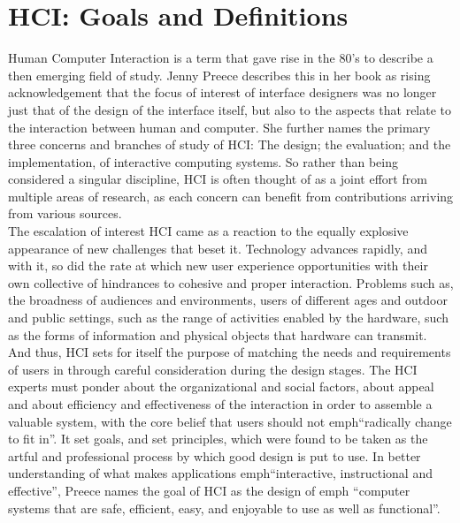 \section{HCI: Goals and Definitions}\label{sec:hci_definition_goals}
    Human Computer Interaction is a term that gave rise in the 80’s to describe a then emerging field of study. Jenny Preece describes this in her book\cite{Preece1994} as rising acknowledgement that the focus of interest of interface designers was no longer just that of the design of the interface itself, but also to the aspects that relate to the interaction between human and computer. She further names the primary three concerns and branches of study of HCI: The design; the evaluation; and the implementation, of interactive computing systems. So rather than being considered a singular discipline, HCI is often thought of as a joint effort from multiple areas of research, as each concern can benefit from contributions arriving from various sources.\\
    The escalation of interest HCI came as a reaction to the equally explosive appearance of new challenges that beset it. Technology advances rapidly, and with it, so did the rate at which new user experience opportunities with their own collective of hindrances to cohesive and proper interaction. Problems such as, the broadness of audiences and environments, users of different ages and outdoor and public settings, such as the range of activities enabled by the hardware, such as the forms of information and physical objects that hardware can transmit.\\
    And thus, HCI sets for itself the purpose of matching the needs and requirements of users in through careful consideration during the design stages. The HCI experts must ponder about the organizational and social factors, about appeal and about efficiency and effectiveness of the interaction in order to assemble a valuable system, with the core belief that users should not emph{“radically change to fit in”}. It set goals, and set principles, which were found to be taken as the artful and professional process by which good design is put to use. In better understanding of what makes applications emph{“interactive, instructional and effective”}, Preece names the goal of HCI as the design of emph{ “computer systems that are safe, efficient, easy, and enjoyable to use as well as functional”}\cite{Preece1994}.\\
